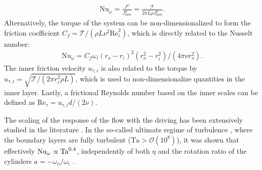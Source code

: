 \begin{align}\label{eq:spanwisenu}
\text{Nu}_\omega = \frac{J^\omega}{J^\omega_{lam}}= \frac{\mathcal{T}}{2\pi L \rho J_{lam}^\omega}.
\end{align}
Alternatively, the torque of the system can be non-dimensionalized to form the friction coefficient $C_f = \mathcal{T}/(\rho L \nu^2 \text{Re}_i^2)$, which is directly related to the Nusselt number:
\begin{align}
\text{Nu}_\omega = C_f \omega_i \left( r_o - r_i \right)^2 \left( r_o^2 - r_i^2\right) / \left(4 \pi \nu r_o^2\right).
\end{align}
The inner friction velocity $u_{\tau,i}$ is also related to the torque by $u_{\tau,i}=\sqrt{\mathcal{T}/(2\pi r_i^2 \rho L)}$, which is used to non-dimensionalize quantities in the inner layer. Lastly, a frictional Reynolds number based on the inner scales can be defined as $\text{Re}_\tau=u_{\tau,i}d/(2\nu)$.

The scaling of the response of the flow with the driving has been extensively studied in the literature \citep{Lathrop1992, Lewis1999, vanGils2011b, Paoletti2011, Ostilla-Monico2013, Fardin2014, Grossmann2016}. In the so-called ultimate regime of turbulence \mbox{\citep{Kraichnan1962,Grossmann2011}}, where the boundary layers are fully turbulent \mbox{($\text{Ta}>\mathcal{O}(10^8)$)}, it was shown that effectively $\text{Nu}_\omega \propto \text{Ta}^{0.4}$, independently of both $\eta$ and the rotation ratio of the cylinders $a=-\omega_o/\omega_i$ \citep{Huisman2012,Ostilla-Monico2014b}.

